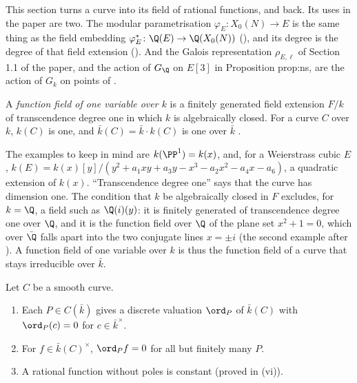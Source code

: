 This section turns a curve into its field of rational functions, and back. Its uses in the paper are two. The modular parametrisation
$\varphi_E\colon X_0(N)\to E$ is the same thing as the field embedding $\varphi_E^*\colon\Q(E)\to\Q(X_0(N))$ (), and its degree is
the degree of that field extension (). And the Galois representation $\rho_{E,\ell}$ of Section 1.1 of the paper, and the action
of $G_\Q$ on $E[3]$ in Proposition prop:ns, are the action of $G_k$ on points of .

\begin{definition}\label{def:curves:function-field}
A \emph{function field of one variable over $k$} is a finitely generated field extension $F/k$ of transcendence degree one in which $k$ is
algebraically closed. For a curve $C$ over $k$, $k(C)$ is one, and $\bar k(C)=\bar k\cdot k(C)$ is one over $\bar k$ \cite[Chapter II, Section 1]{SilvermanAEC}.
\end{definition}

The examples to keep in mind are $k(\PP^1)=k(x)$, and, for a Weierstrass cubic $E$, $k(E)=k(x)[y]/(y^2+a_1xy+a_3y-x^3-a_2x^2-a_4x-a_6)$, a quadratic
extension of $k(x)$. ``Transcendence degree one'' says that the curve has dimension one. The condition that $k$ be algebraically closed in $F$ excludes, for
$k=\Q$, a field such as $\Q(i)(y)$: it is finitely generated of transcendence degree one over $\Q$, and it is the function field over $\Q$ of the plane set
$x^2+1=0$, which over $\bar\Q$ falls apart into the two conjugate lines $x=\pm i$ (the second example after ). A function field
of one variable over $k$ is thus the function field of a curve that stays irreducible over $\bar k$.

\begin{proposition}\label{prop:curves:function-field}
Let $C$ be a smooth curve.
\begin{enumerate}[label=(\roman*)]
\item Each $P\in C(\bar k)$ gives a discrete valuation $\ord_P$ of $\bar k(C)$ with $\ord_P(c)=0$ for $c\in\bar k^\times$.
\item For $f\in\bar k(C)^\times$, $\ord_Pf=0$ for all but finitely many $P$.
\item A rational function without poles is constant (proved in (vi)).
\end{enumerate}
\end{proposition}

